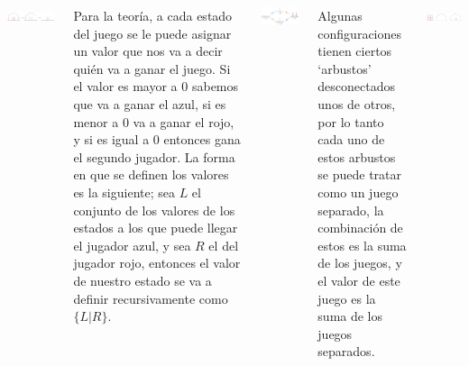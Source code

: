 \documentclass[20pt,margin=2.2cm,innermargin=-4.5in,blockverticalspace=-0.25in]{tikzposter}
\begin{document}
\begin{columns}
{{            \vspace{7mm}
            \begin{minipage}[t]{\linewidth}
                \centering
                \includegraphics[width=.7\textwidth]{images/hackenbush-game_example.pdf}
            \end{minipage}
        }

        
        \vspace{5mm}
        Para la teor\'ia, a cada estado del juego se le puede asignar un valor que nos va a decir qui\'en va a ganar el juego. Si el valor es mayor a $0$ sabemos que va a ganar el azul, si es menor a $0$ va a ganar el rojo, y si es igual a $0$ entonces gana el segundo jugador. La forma en que se definen los valores es la siguiente; sea $L$ el conjunto de los valores de los estados a los que puede llegar el jugador azul, y sea $R$ el del jugador rojo, entonces el valor de nuestro estado se va a definir recursivamente como $\{L|R\}$.
        \vspace{7mm}
        
        \begin{minipage}[t]{\linewidth}
            \centering
            \includegraphics[width=.7\textwidth]{images/hackenbush-surr_roots.pdf}
        \end{minipage}

        Algunas configuraciones tienen ciertos `arbustos' desconectados unos de otros, por lo tanto cada uno de estos arbustos se puede tratar como un juego separado, la combinaci\'on de estos es la suma de los juegos, y el valor de este juego es la suma de los juegos separados.
        \vspace{7mm}

        \begin{minipage}[t]{\linewidth}
            \centering
            \includegraphics[width=.7\textwidth]{images/hackenbush-sum_example.pdf}
        \end{minipage}

}
\end{columns}
\end{document}
